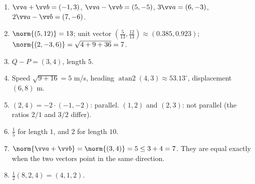 \begin{enumerate}[label=\textbf{\ansnum.\arabic*}]
  \item $\vv a+\vv b=(-1,3)$, $\vv a-\vv b=(5,-5)$, $3\vv a=(6,-3)$, $2\vv a-\vv b=(7,-6)$.
  \item $\norm{(5,12)}=13$; unit vector $(\frac5{13},\frac{12}{13})\approx(0.385,0.923)$; $\norm{(2,-3,6)}=\sqrt{4+9+36}=7$.
  \item $Q-P=(3,4)$, length $5$.
  \item Speed $\sqrt{9+16}=5$ m/s, heading $\operatorname{atan2}(4,3)\approx53.13^\circ$, displacement $(6,8)$ m.
  \item $(2,4)=-2\cdot(-1,-2)$: parallel. $(1,2)$ and $(2,3)$: not parallel (the ratios $2/1$ and $3/2$ differ).
  \item $\frac15$ for length $1$, and $2$ for length $10$.
  \item $\norm{\vv a+\vv b}=\norm{(3,4)}=5\le3+4=7$. They are equal exactly when the two vectors point in the same direction.
  \item $\frac12(8,2,4)=(4,1,2)$.
\end{enumerate}
